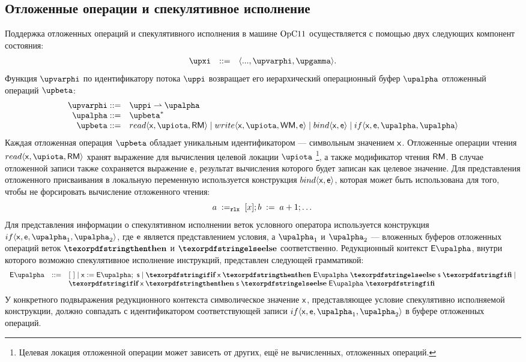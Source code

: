\subsection{Отложенные операции и спекулятивное исполнение}
\label{sec:opc11:formal:spec}

Поддержка отложенных операций и спекулятивного исполнения в машине $\mathrm{OpC11}$ осуществляется
с помощью двух следующих компонент состояния:
\[\begin{array}{r c l}
\auxX             & ::=        & \angled{..., \stPhi, \stGamma}. \\
\end{array}\]
Функция $\stPhi$ по идентификатору потока $\stpath$ возвращает его иерархический
операционный буфер $\stAlpha$ отложенный операций $\stPostOp$:
\[\begin{array}{r l}
    \stPhi    ::= & \stpath \prarrow \stAlpha \\
    \stAlpha  ::= & \stPostOp^{*} \\
    \stPostOp ::= & read\angled{\vName,\locVar,\RM} \mid
                    write\angled{\vName,\locVar,\WM,\Expr} \mid
                    bind\angled{\vName,\Expr} \mid
                    if\angled{\vName,\Expr,\stAlpha,\stAlpha}\\
\end{array}\]
Каждая отложенная операция $\stPostOp$ обладает уникальным идентификатором --- символьным значением $\mathsf{x}$.
Отложенные операции чтения $read\angled{\vName,\locVar,\RM}$ хранят выражение для вычисления целевой локации $\locvar$%
\footnote{Целевая локация отложенной операции может зависеть от других,
ещё не вычисленных, отложенных операций.},
а также модификатор чтения $\mathsf{RM}$.
В случае отложенной записи также сохраняется выражение $\mathsf{e}$, результат вычисления которого будет записан как целевое значение.
Для представления отложенного присваивания в локальную переменную используется конструкция $bind\langle \mathsf{x}, \mathsf{e} \rangle$, которая
может быть использована для того, чтобы не форсировать вычисление отложенного чтения:
\[
a \;:=_{\mathtt{rlx}}\;[x]; b\;:=\;a + 1; \dots
\]
Для представления информации о спекулятивном исполнении веток условного оператора используется конструкция
$if\angled{\vName,\Expr,\stAlpha_1,\stAlpha_2}$,
где $\mathsf{e}$ является представлением условия, а $\stAlpha_1$ и $\stAlpha_2$ --- вложенных буферов отложенных операций
веток $\kw{then}$ и $\kw{else}$ соответственно.
Редукционный контекст $\EvalSpecContext$, внутри которого возможно спекулятивное исполнение инструкций, представлен
следующей грамматикой:
\[\begin{array}{rcl}
\EvalSpecContext & ::= & \hole \mid
                         \Bind{\vName}{\EvalSpecContext}{\AST} \mid
    \IfThenElse{\vName}{\EvalSpecContext}{\AST}\mid \\
&& \IfThenElse{\vName}{\AST}{\EvalSpecContext}
\end{array}\]
У конкретного подвыражения редукционного контекста символическое значение $\mathsf{x}$, представляющее условие спекулятивно
исполняемой конструкции, должно совпадать с идентификатором соответствующей записи $if\angled{\vName,\Expr,\stAlpha_1,\stAlpha_2}$
в буфере отложенных операций.

